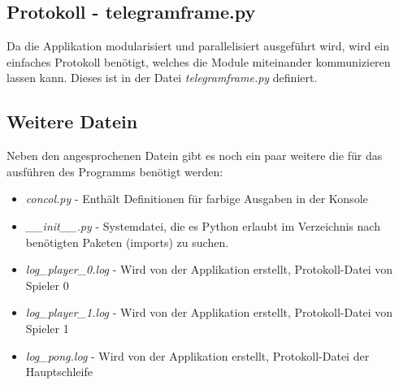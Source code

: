 \documentclass[12pt,twoside]{article}
\theoremstyle{plain}
\theoremstyle{definition}
\theoremstyle{remark}
\begin{document}
\subsection{Protokoll - telegramframe.py}
\label{telegramframe.py}

Da die Applikation modularisiert und parallelisiert ausgeführt wird, wird ein einfaches Protokoll benötigt, welches die Module miteinander kommunizieren lassen kann. Dieses ist in der Datei \textit{telegramframe.py} definiert. 


\subsection{Weitere Datein}
\label{otherfiles}


Neben den angesprochenen Datein gibt es noch ein paar weitere die für das ausführen des Programms benötigt werden:

\begin{itemize}
  \item \textit{concol.py} \tabto{4cm}- Enthält Definitionen für farbige Ausgaben in der \tabto{5cm} Konsole
  \item \textit{\_\_init\_\_.py} \tabto{4cm}- Systemdatei, die es Python erlaubt im Verzeichnis \tabto{5cm} nach benötigten Paketen (imports) zu suchen.  
  \item \textit{log\_player\_0.log} \tabto{4cm}- Wird von der Applikation erstellt, Protokoll-Datei \tabto{5cm} von Spieler 0 
  \item \textit{log\_player\_1.log} \tabto{4cm}- Wird von der Applikation erstellt, Protokoll-Datei \tabto{5cm} von Spieler 1 
  \item \textit{log\_pong.log} \tabto{4cm}- Wird von der Applikation erstellt, Protokoll-Datei \tabto{5cm}der Hauptschleife 
\end{itemize}
\end{document}
